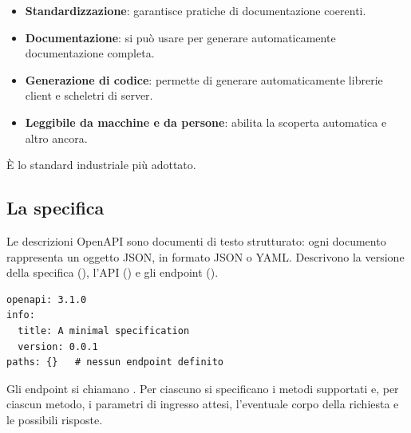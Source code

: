 \begin{itemize}
  \item \textbf{Standardizzazione}: garantisce pratiche di documentazione
        coerenti.
  \item \textbf{Documentazione}: si può usare per generare automaticamente
        documentazione completa.
  \item \textbf{Generazione di codice}: permette di generare automaticamente
        librerie client e scheletri di server.
  \item \textbf{Leggibile da macchine e da persone}: abilita la scoperta
        automatica e altro ancora.
\end{itemize}

È lo standard industriale più adottato.

\subsection{La specifica}

Le descrizioni OpenAPI sono documenti di testo strutturato: ogni documento
rappresenta un oggetto JSON, in formato JSON o YAML. Descrivono la versione
della specifica (), l'API () e gli endpoint
().

\begin{lstlisting}[style=plain, name=openapi.yaml]
openapi: 3.1.0
info:
  title: A minimal specification
  version: 0.0.1
paths: {}   # nessun endpoint definito
\end{lstlisting}

Gli endpoint si chiamano . Per ciascuno si specificano i metodi
supportati e, per ciascun metodo, i parametri di ingresso attesi, l'eventuale
corpo della richiesta e le possibili risposte.

